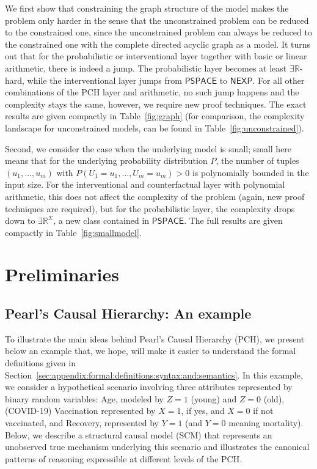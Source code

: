 \documentclass[a4paper,UKenglish,cleveref, autoref, thm-restate]{lipics-v2021}
\newcommand{\IR}{\mathbb{R}}
\newcommand{\existsR}{\ensuremath{\mathsf{\exists\IR}}}
\newcommand{\NEXP}{\ensuremath{\mathsf{NEXP}}}
\newcommand{\PSPACE}{\ensuremath{\mathsf{PSPACE}}}
\begin{document}
We first show that constraining the graph structure of the model makes the problem only harder in the sense that the unconstrained problem can be reduced to the constrained one, since the unconstrained problem can always be reduced to the constrained one with the complete directed acyclic graph as a model. It turns out that for the probabilistic or interventional layer together with basic or linear arithmetic, there is indeed a jump. The probabilistic layer becomes at least $\existsR$-hard, while  the interventional layer jumps from $\PSPACE$ to $\NEXP$. For all other combinations of the PCH layer and arithmetic, no such jump happens and the complexity stays the same, however, we require new proof techniques. The exact results are given compactly in Table~\ref{fig:graph} (for comparison, the complexity landscape for unconstrained models, can be found in Table~\ref{fig:unconstrained}).

Second, we consider the case when the underlying model is small; small here means that for the underlying probability distribution $P$, the number of tuples $(u_1,\dots,u_m)$ with $P(U_1 = u_1,\dots,U_m = u_m) > 0$ is polynomially bounded in the input size. For the interventional and counterfactual layer with polynomial arithmetic, this does not affect the complexity of the problem (again, new proof techniques are required), but for the probabilistic layer, the complexity drops down to $\existsR^\Sigma$, a new class contained in $\PSPACE$.
The full results are given compactly in Table~\ref{fig:smallmodel}.

\section{Preliminaries}
\label{sec:preliminaries}

\subsection{Pearl’s Causal Hierarchy: An example}

\label{sec:example:PCH}


To illustrate the main ideas behind Pearl’s Causal Hierarchy (PCH), we present below
an example that, we hope, will make it easier to understand the formal definitions given in Section~\ref{sec:appendix:formal:definitions:syntax:and:semantics}.
In this example, we consider a hypothetical scenario involving three attributes represented by binary random variables:
Age, modeled by $Z=1$ (young) and $Z=0$ (old), (COVID-19) Vaccination represented by $X=1$, if yes, and $X=0$ if not vaccinated, and Recovery, represented by $Y=1$ (and $Y=0$ meaning mortality).
Below, we describe a structural causal model (SCM) that represents an unobserved true mechanism underlying this scenario and illustrates the canonical patterns of reasoning expressible at different levels of the PCH.
\end{document}
